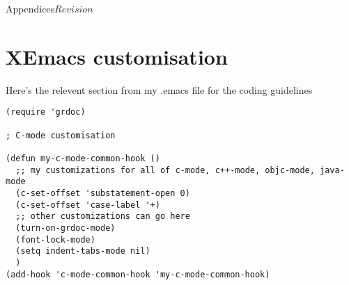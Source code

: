 %   

\begin{cactuspart}{10}{Appendices}{}{$Revision$}
\renewcommand{\thepage}{\Alph{part}\arabic{page}}

\chapter{XEmacs customisation}

Here's the relevent section from my .emacs file for the coding guidelines

\begin{verbatim}
(require 'grdoc)

; C-mode customisation

(defun my-c-mode-common-hook ()
  ;; my customizations for all of c-mode, c++-mode, objc-mode, java-mode
  (c-set-offset 'substatement-open 0)
  (c-set-offset 'case-label '+)
  ;; other customizations can go here
  (turn-on-grdoc-mode)
  (font-lock-mode)
  (setq indent-tabs-mode nil)
  )
(add-hook 'c-mode-common-hook 'my-c-mode-common-hook)
\end{verbatim}


\end{cactuspart}
